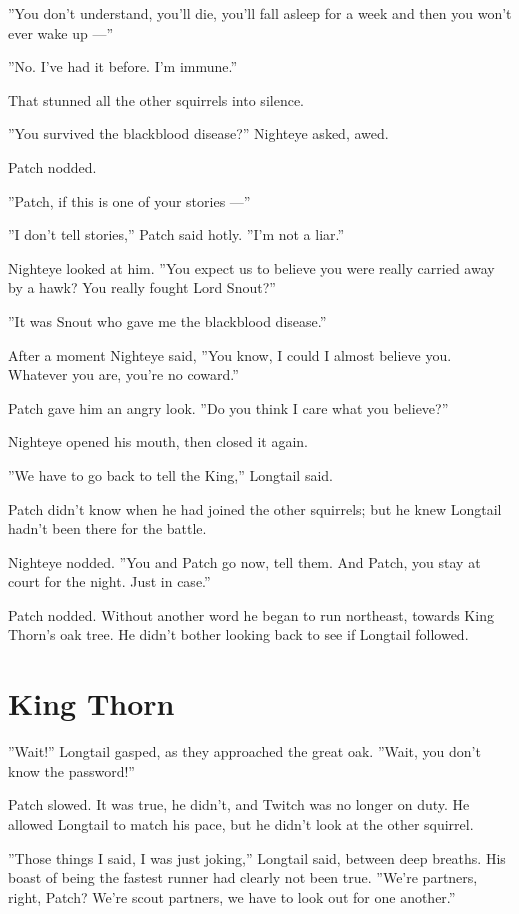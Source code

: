 \documentclass[12pt]{book}
\begin{document}
''You don't understand, you'll die, you'll fall asleep for a week and
then you won't ever wake up ---''

''No. I've had it before. I'm immune.''

That stunned all the other squirrels into silence.

''You survived the blackblood disease?'' Nighteye asked, awed.

Patch nodded.

''Patch, if this is one of your stories ---''

''I don't tell stories,'' Patch said hotly. ''I'm not a liar.''

Nighteye looked at him. ''You expect us to believe you were really
carried away by a hawk? You really fought Lord Snout?''

''It was Snout who gave me the blackblood disease.''

After a moment Nighteye said, ''You know, I could I almost believe
you. Whatever you are, you're no coward.''

Patch gave him an angry look. ''Do you think I care what you
believe?''

Nighteye opened his mouth, then closed it again.

''We have to go back to tell the King,'' Longtail said.

Patch didn't know when he had joined the other squirrels; but he knew
Longtail hadn't been there for the battle.

Nighteye nodded. ''You and Patch go now, tell them. And Patch, you
stay at court for the night. Just in case.''

Patch nodded. Without another word he began to run northeast, towards
King Thorn's oak tree. He didn't bother looking back to see if
Longtail followed.


\section{King Thorn}

''Wait!'' Longtail gasped, as they approached the great oak. ''Wait,
you don't know the password!''

Patch slowed. It was true, he didn't, and Twitch was no longer on
duty. He allowed Longtail to match his pace, but he didn't look at the
other squirrel.

''Those things I said, I was just joking,'' Longtail said, between
deep breaths. His boast of being the fastest runner had clearly not
been true. ''We're partners, right, Patch? We're scout partners, we
have to look out for one another.''
\end{document}
